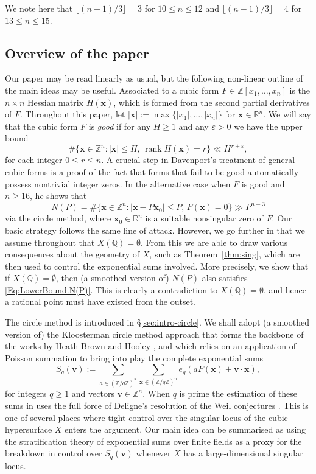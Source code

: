 \documentclass[a4paper,11pt, twoside,reqno]{amsart}
\theoremstyle{plain}
\theoremstyle{definition}
\theoremstyle{remark}
\newcommand{\bfv}{\bm{v}}
\newcommand{\bfx}{\bm{x}}
\newcommand{\ZZ}{\mathbb{Z}}
\newcommand{\RR}{\mathbb{R}}
\newcommand{\QQ}{\mathbb{Q}}
\DeclareMathOperator{\rank}{rank}
\newcommand{\x}{\bm{x}}
\newcommand{\ve}{\varepsilon}
\renewcommand{\le}{\leqslant}
\renewcommand{\leq}{\leqslant}
\renewcommand{\ge}{\geqslant}
\renewcommand{\geq}{\geqslant}
\numberwithin{equation}{section}
\begin{document}
We note here that $\lfloor (n-1)/3 \rfloor = 3$ for $10\le n\le 12$ and $\lfloor (n-1)/3 \rfloor= 4$ for $13\le n\le 15$.






\subsection*{Overview of the paper}
\label{sec:overview}

Our paper may be read linearly as usual,
but the following non-linear outline of the main ideas
may be useful.  Associated to 
a cubic form $F\in \ZZ[x_1,\dots,x_n]$
is the $n\times n$ Hessian matrix  $H(\bm{x})$, which is formed from the second partial derivatives of $F$.
Throughout this paper, let $|\bfx| := \max\{|x_1|,\dots,|x_n|\}$
for $\bfx\in \RR^n$.
We will say that the cubic form $F$ is {\em good} if 
for any $H\geq 1$ and any $\ve>0$ we have the upper bound
\[
\#\{\x\in\ZZ^{n}: |\x|\leq H,\,\rank H(\x)=r\}\ll H^{r+\ve},
\]
for each integer $0\leq r\leq n$.  A crucial step in Davenport's \cite{Dav63}
treatment of general cubic forms is a proof of the fact that forms
that fail to be good automatically possess nontrivial integer
zeros. In the alternative case when $F$ is good and $n\ge 16$, he shows that 
\begin{equation}\label{Eq:LowerBound.N(P)}
N(P) =\#\{ \bfx\in \ZZ^n\colon |\bm{x}-P\bm{x}_0|\leq P,\, F(\bm{x})=0\}\gg P^{n-3}
\end{equation}
via the circle method, where  $\bm{x}_0\in \RR^n$ is a suitable nonsingular zero of $F$. Our basic strategy follows the same line of attack. However, we go further in that we assume throughout that $X(\QQ)=\emptyset$. From this we are able to draw various consequences about the geometry of $X$, such as Theorem~\ref{thm:sing},  which are then used to control the exponential sums involved. More precisely, we show that if $X(\QQ)=\emptyset$, then  (a smoothed version of) $N(P)$ also satisfies \eqref{Eq:LowerBound.N(P)}.
This is clearly a contradiction to $X(\QQ)=\emptyset$, and hence a rational point must have existed from the outset. 

The circle method is introduced in \S\ref{sec:intro-circle}.
We shall adopt (a smoothed version of) the Kloosterman circle method approach that forms the backbone of the works by Heath-Brown \cite{hb10} and Hooley \cite{hooley9}, and which relies on an application 
of Poisson summation to bring into play 
the complete exponential sums
\begin{equation}\label{eq:defSq}
S_q(\bm{v})
:= \sum_{a\in (\ZZ/q\ZZ)^\ast} \sum_{\bfx\in (\ZZ/q\ZZ)^n}
e_q(aF(\bm{x})+\bm{v}\cdot \bm{x}),
\end{equation}
for integers $q\ge 1$ and vectors $\bfv\in \ZZ^n$. 
When $q$ is prime the estimation of these sums in \cite{hb10,hooley9} uses the full force of Deligne's resolution of the Weil conjectures \cite{Del}. 
This is one of several places where tight control over the singular locus of the cubic hypersurface $X$ enters the argument.
Our main idea can be summarised as using
the stratification theory of exponential sums
over finite fields
as a proxy for the breakdown in control over 
$S_q(\bm{v})$ whenever $X$ has a large-dimensional singular locus.
\end{document}
